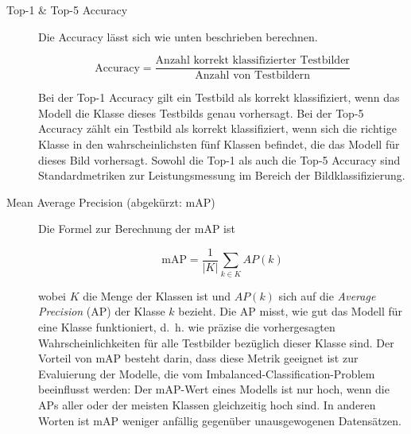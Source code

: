 \begin{description}
	\item[Top-1 \& Top-5 Accuracy] Die Accuracy lässt sich wie unten beschrieben berechnen.
	
	\begin{equation} \label{eq:accuracy}
		\text{Accuracy} = \frac{\text{Anzahl korrekt klassifizierter Testbilder}}{\text{Anzahl von Testbildern}}
	\end{equation}
	
	Bei der Top-1 Accuracy gilt ein Testbild als korrekt klassifiziert, wenn das Modell die Klasse dieses Testbilds genau vorhersagt. Bei der Top-5 Accuracy zählt ein Testbild als korrekt klassifiziert, wenn sich die richtige Klasse in den wahrscheinlichsten fünf Klassen befindet, die das Modell für dieses Bild vorhersagt. Sowohl die Top-1 als auch die Top-5 Accuracy sind Standardmetriken zur Leistungsmessung im Bereich der Bildklassifizierung.
	
	\item[Mean Average Precision (abgekürzt: mAP)] Die Formel zur Berechnung der mAP ist
	
	\begin{equation} \label{eq:map}
		\text{mAP} = \frac{1}{\lvert K\rvert}\sum_{k \in K}AP(k)
	\end{equation}
	
	wobei $K$ die Menge der Klassen ist und $AP(k)$ sich auf die \emph{Average Precision} (AP) der Klasse $k$ bezieht. Die AP misst, wie gut das Modell für eine Klasse funktioniert, d.~h. wie präzise die vorhergesagten Wahrscheinlichkeiten für alle Testbilder bezüglich dieser Klasse sind. Der Vorteil von mAP besteht darin, dass diese Metrik geeignet ist zur Evaluierung der Modelle, die vom Imbalanced-Classification-Problem beeinflusst werden: Der mAP-Wert eines Modells ist nur hoch, wenn die APs aller oder der meisten Klassen gleichzeitig hoch sind. In anderen Worten ist mAP weniger anfällig gegenüber unausgewogenen Datensätzen. 
	
\end{description}

